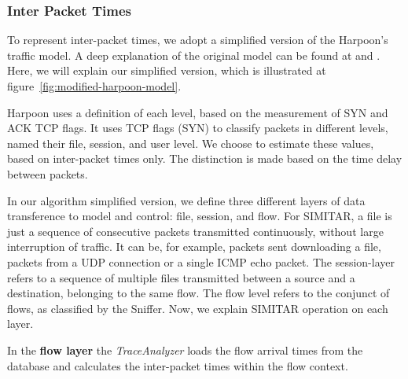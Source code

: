\subsubsection{Inter Packet Times}

To represent inter-packet times, we adopt a simplified version of the Harpoon's traffic model. A deep explanation of the original model can be found at \cite{harpoon-paper} and \cite{harpoon-validation}. Here, we will explain our simplified version, which is illustrated at figure~\ref{fig:modified-harpoon-model}. 

Harpoon uses a definition of each level, based on the measurement of SYN and ACK TCP flags. It uses TCP flags (SYN) to classify packets in different levels, named their file, session, and user level. We choose to estimate these values, based on inter-packet times only. The distinction is made based on the time delay between packets.


In our algorithm simplified version, we define three different layers of data transference to model and control: file, session, and flow. For SIMITAR, a file is just a sequence of consecutive packets transmitted continuously, without large interruption of traffic. It can be, for example, packets sent downloading a file, packets from a  UDP  connection or a single ICMP echo packet. The session-layer refers to a sequence of multiple files transmitted between a source and a destination, belonging to the same flow.  The flow level refers to the conjunct of flows, as classified by the Sniffer.  Now, we explain SIMITAR operation on each layer. 


In the \textbf{flow layer} the \textit{TraceAnalyzer} loads the flow arrival times from the database and calculates the inter-packet times within the flow context. 


